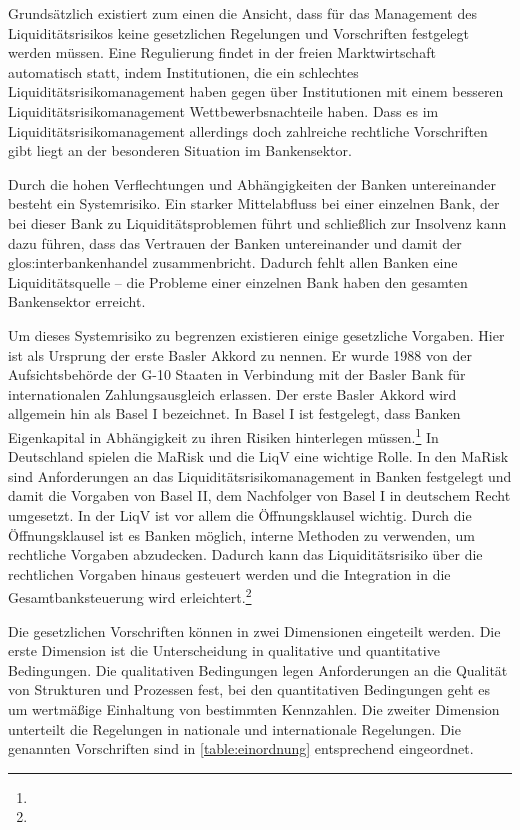 Grundsätzlich existiert zum einen die Ansicht, dass für das Management des Liquiditätsrisikos keine gesetzlichen Regelungen und Vorschriften festgelegt werden müssen. Eine Regulierung findet in der freien Marktwirtschaft automatisch statt, indem Institutionen, die ein schlechtes Liquiditätsrisikomanagement haben gegen über Institutionen mit einem besseren Liquiditätsrisikomanagement Wettbewerbsnachteile haben. Dass es im Liquiditätsrisikomanagement allerdings doch zahlreiche rechtliche Vorschriften gibt liegt an der besonderen Situation im Bankensektor. 

Durch die hohen Verflechtungen und Abhängigkeiten der Banken untereinander besteht ein Systemrisiko. Ein starker Mittelabfluss bei einer einzelnen Bank, der bei dieser Bank zu Liquiditätsproblemen führt und schließlich zur Insolvenz kann dazu führen, dass das Vertrauen der Banken untereinander und damit der \gls{glos:interbankenhandel} zusammenbricht. Dadurch fehlt allen Banken eine Liquiditätsquelle -- die Probleme einer einzelnen Bank haben den gesamten Bankensektor erreicht.

Um dieses Systemrisiko zu begrenzen existieren einige gesetzliche Vorgaben. Hier ist als Ursprung der erste Basler Akkord zu nennen. Er wurde 1988 von der Aufsichtsbehörde der G-10 Staaten in Verbindung mit der Basler Bank für internationalen Zahlungsausgleich erlassen. Der erste Basler Akkord wird allgemein hin als Basel I bezeichnet. In Basel I ist festgelegt, dass Banken Eigenkapital in Abhängigkeit zu ihren Risiken hinterlegen müssen.\footnote{ } In Deutschland spielen die \gls{MaRisk} und die \gls{LiqV} eine wichtige Rolle. In den \gls{MaRisk} sind Anforderungen an das Liquiditätsrisikomanagement in Banken festgelegt und damit die Vorgaben von Basel II, dem Nachfolger von Basel I in deutschem Recht umgesetzt. In der \gls{LiqV} ist vor allem die Öffnungsklausel wichtig. Durch die Öffnungsklausel ist es Banken möglich, interne Methoden zu verwenden, um rechtliche Vorgaben abzudecken. Dadurch kann das Liquiditätsrisiko über die rechtlichen Vorgaben hinaus gesteuert werden und die Integration in die Gesamtbanksteuerung wird erleichtert.\footnote{ }

Die gesetzlichen Vorschriften können in zwei Dimensionen eingeteilt werden. Die erste Dimension ist die Unterscheidung in qualitative und quantitative Bedingungen. Die qualitativen Bedingungen legen Anforderungen an die Qualität von Strukturen und Prozessen fest, bei den quantitativen Bedingungen geht es um wertmäßige Einhaltung von bestimmten Kennzahlen. Die zweiter Dimension unterteilt die Regelungen in nationale und internationale Regelungen. Die genannten Vorschriften sind in \vref{table:einordnung} entsprechend eingeordnet. 


